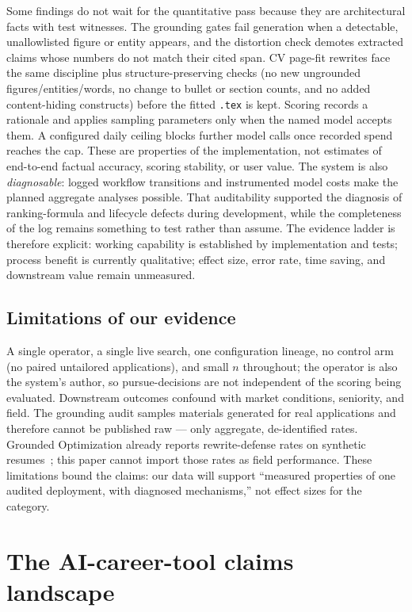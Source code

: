 \documentclass[11pt]{article}
\begin{document}
Some findings do not wait for the quantitative pass because they are
architectural facts with test witnesses. The grounding gates fail generation
when a detectable, unallowlisted figure or entity appears, and the distortion
check demotes extracted claims whose numbers do not match their cited span.
CV page-fit rewrites face the same discipline plus structure-preserving
checks (no new ungrounded figures/entities/words, no change to bullet or
section counts, and no added content-hiding constructs) before the fitted
\texttt{.tex} is kept.
Scoring records a rationale and applies sampling parameters only when the
named model accepts them. A configured daily ceiling blocks further model
calls once recorded spend reaches the cap. These are properties of the
implementation, not estimates of end-to-end factual accuracy, scoring
stability, or user value. The system is also \emph{diagnosable}: logged
workflow transitions and instrumented model costs make the planned aggregate
analyses possible. That auditability supported the diagnosis of
ranking-formula and lifecycle defects during development, while the
completeness of the log remains something to test rather than assume. The
evidence ladder is therefore explicit: working capability is established by
implementation and tests; process benefit is currently qualitative; effect
size, error rate, time saving, and downstream value remain unmeasured.

\subsection{Limitations of our evidence}
\label{sec:limitations}

A single operator, a single live search, one configuration lineage, no
control arm (no paired untailored applications), and small $n$ throughout;
the operator is also the system's author, so pursue-decisions are not
independent of the scoring being evaluated. Downstream outcomes confound
with market conditions, seniority, and field. The grounding audit samples
materials generated for real applications and therefore cannot be published
raw --- only aggregate, de-identified rates. Grounded Optimization already
reports rewrite-defense rates on synthetic resumes~\citep{indukuri2026grounded};
this paper cannot import those rates as field performance. These limitations
bound the claims: our data will support ``measured properties of one audited
deployment, with diagnosed mechanisms,'' not effect sizes for the category.

\section{The AI-career-tool claims landscape}
\label{sec:claims}
\end{document}

